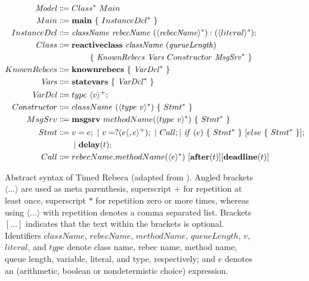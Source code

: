 \documentclass[
graybox,
envcountchap
]{svmult}
\begin{document}
\begin{bibunit}
\begin{figure}[!htbp]
 	\begin{center}
 		\small
 		\begin{mdframed}
 			\begin{align*}
 		\mathit{Model} &\Coloneqq  Class^* ~ Main \qquad \\
 				Main &\Coloneqq \mathbf{main} ~ \{ ~ InstanceDcl^* ~ \} \qquad \\
 				InstanceDcl &\Coloneqq \mathit{className} ~ \mathit{rebecName}~(\langle \mathit{rebecName} \rangle ^*)  : (\langle literal \rangle ^*);\\
 				Class &\Coloneqq \mathbf{reactiveclass} ~ \mathit{className} ~ (\mathit{queueLength}) ~ 
 				\\ ~~~& ~~~~~~~~~~~~ 
 				\{ ~ \mathit{KnownRebecs} ~ \mathit{Vars} ~ Constructor ~ \mathit{MsgSrv}^* ~ \}\\
 				KnownRebecs &\Coloneqq \mathbf{knownrebecs} ~ \{ ~ \mathit{VarDcl}^* ~ \} ~ \\
 				\mathit{Vars} &\Coloneqq \mathbf{statevars} ~ \{ ~ \mathit{VarDcl}^* ~ \} ~ \\
 				\mathit{VarDcl} &\Coloneqq type ~ \langle v \rangle ^+;\\
 				Constructor &\Coloneqq className ~ (\langle type ~ v \rangle ^*) ~ \{ ~ Stmt^* ~ \} \\
 				MsgSrv &\Coloneqq \mathbf{msgsrv} ~ methodName(\langle type ~ v \rangle ^*) ~ \{ ~ Stmt^* ~ \} \\
 				Stmt &\Coloneqq v = e; ~| ~ v = ?(e\langle ,e \rangle^+); ~| ~ Call;| ~ {\it if} ~ (e) ~ \{ ~ Stmt^* ~ \} ~ [else ~ \{ ~ Stmt^* ~ \}]; \\ ~~~& ~~~~~~  |  ~ \mathbf{delay}(t); \\
 				Call &\Coloneqq rebecName.methodName(\langle e \rangle ^*) ~  [\mathbf{after}(t)]  [\mathbf{deadline}(t)]
 			\end{align*}
 		\end{mdframed}
 		\caption{Abstract syntax of Timed Rebeca (adapted from \cite{DBLP:journals/scp/KhamespanahSSKI15}). Angled brackets $\langle$...$\rangle$ are used as meta parenthesis, superscript $+$ for repetition at least once, superscript $*$ for repetition zero or more times, whereas using $\langle$...$\rangle$ with repetition denotes a comma separated list. Brackets $[...]$ indicates that the text within the brackets is optional. Identifiers $className$, $rebecName$, $methodName$, $queueLength$, $v$, $literal$, and $type$ denote class name, rebec name, method name, queue length, variable, literal, and type, respectively; and $e$ denotes an (arithmetic, boolean or nondetermistic choice) expression.
}
\end{center}
\end{figure}
\end{bibunit}
\end{document}
